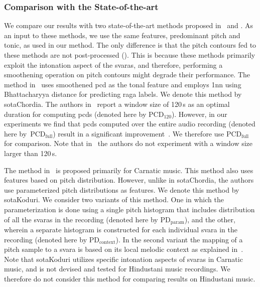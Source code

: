 \subsubsection{Comparison with the State-of-the-art}
\label{sec:raga_rec_pattern_comparison_sota}

We compare our results with two state-of-the-art methods proposed in~\citep{chordia2013joint} and \citep{koduri2014intonation}. As an input to these methods, we use the same features, predominant pitch and tonic, as used in our method. The only difference is that the pitch contours fed to these methods are not post-processed (). This is because these methods primarily exploit the intonation aspect of the \glspl{svara}, and therefore, performing a smoothening operation on pitch contours might degrade their performance. The method in~\cite{chordia2013joint} uses smoothened \acrfull{pcd} as the tonal feature and employs \acrfull{1nn} using Bhattacharyya distance for predicting \gls{raga} labels. We denote this method by \acrshort{sotaChordia}. The authors in~\cite{chordia2013joint} report a window size of 120\,s as an optimal duration for computing \glspl{pcd} (denoted here by $\mathrm{PCD}_{120}$). However, in our experiments we find that \glspl{pcd} computed over the entire audio recording (denoted here by~$\mathrm{PCD}_\mathrm{full}$) result in a significant improvement~\citep{gulatiphrase_2016}. We therefore use $\mathrm{PCD}_\mathrm{full}$ for comparison. Note that in~\cite{chordia2013joint} the authors do not experiment with a window size larger than 120\,s. 

The method in~\cite{koduri2014intonation} is proposed primarily for Carnatic music. This method also uses features based on pitch distribution. However, unlike in \acrshort{sotaChordia}, the authors use parameterized pitch distributions as features. We denote this method by \acrshort{sotaKoduri}. We consider two variants of this method. One in which the parameterization is done using a single pitch histogram that includes distribution of all the \glspl{svara} in the recording (denoted here by $\mathrm{PD}_\mathrm{param}$), and the other, wherein a separate histogram is constructed for each individual \gls{svara} in the recording (denoted here by $\mathrm{PD}_\mathrm{context}$). In the second variant the mapping of a pitch sample to a \gls{svara} is based on its local melodic context as explained in~\cite{koduri2014intonation}. Note that \acrshort{sotaKoduri} utilizes specific intonation aspects of \glspl{svara} in Carnatic music, and is not devised and tested for Hindustani music recordings. We therefore do not consider this method for comparing results on Hindustani music. 

